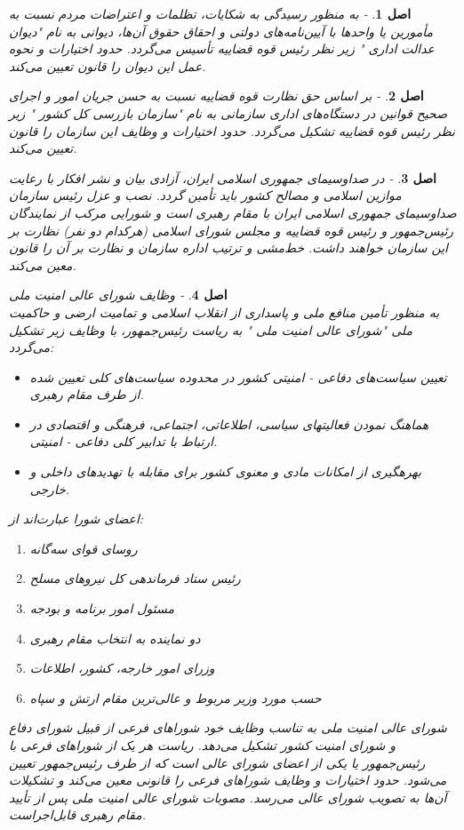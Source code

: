 \documentclass[12pt]{article}
\newtheorem{asl}{اصل}
\begin{document}
\begin{asl}- 
به منظور رسیدگی به شکایات، تظلمات و اعتراضات مردم نسبت به مأمورین یا واحدها با آیین‌نامه‌های دولتی و احقاق حقوق آن‌ها، دیوانی به نام "دیوان عدالت اداری " زیر نظر رئیس قوه قضاییه تأسیس می‌گردد. حدود اختیارات و نحوه عمل این دیوان را قانون تعیین می‌کند.  
\end{asl}

\begin{asl}- 
بر اساس حق نظارت قوه قضاییه نسبت به حسن جریان امور و اجرای صحیح قوانین در دستگاه‌های اداری سازمانی به نام "سازمان بازرسی کل کشور " زیر نظر رئیس قوه قضاییه تشکیل می‌گردد. حدود اختیارات و وظایف این سازمان را قانون تعیین می‌کند. 
\end{asl}

\begin{asl}- 
در صداوسیمای جمهوری اسلامی ایران، آزادی بیان و نشر افکار با رعایت موازین اسلامی و مصالح کشور باید تأمین گردد. نصب و عزل رئیس سازمان صداوسیمای جمهوری اسلامی ایران با مقام رهبری است و شورایی مرکب از نمایندگان رئیس‌جمهور و رئیس قوه قضاییه و مجلس شورای اسلامی (هرکدام دو نفر) نظارت بر این سازمان خواهند داشت. خط‌مشی و ترتیب اداره سازمان و نظارت بر آن را قانون معین می‌کند.  
\end{asl}

\begin{asl}- 
وظایف شورای عالی امنیت ملی 
\\
به منظور تأمین منافع ملی و پاسداری از انقلاب اسلامی و تمامیت ارضی و حاکمیت ملی "شورای عالی امنیت ملی " به ریاست رئیس‌جمهور، با وظایف زیر تشکیل می‌گردد:
\renewcommand{\labelitemi}{$-$}
\begin{itemize}
	\item 
	تعیین سیاست‌های دفاعی - امنیتی کشور در محدوده سیاست‌های کلی تعیین شده از طرف مقام رهبری. 
	\item
	هماهنگ نمودن فعالیت‏های سیاسی، اطلاعاتی، اجتماعی، فرهنگی و اقتصادی در ارتباط با تدابیر کلی دفاعی - امنیتی. 
	\item
		بهره‏گیری از امکانات مادی و معنوی کشور برای مقابله با تهدیدهای داخلی و خارجی.
\end{itemize}
اعضای شورا عبارت‌اند از:
\begin{enumerate}
	\item 
	روسای قوای سه‌گانه 
	\item
	رئیس ستاد فرماندهی کل نیروهای مسلح 	
	\item
	مسئول امور برنامه و بودجه 
	\item
	دو نماینده به انتخاب مقام رهبری 
	\item
	وزرای امور خارجه، کشور، اطلاعات 
	\item
	حسب مورد وزیر مربوط و عالی‌ترین مقام ارتش و سپاه 
	
\end{enumerate} 

شورای عالی امنیت ملی به تناسب وظایف خود شوراهای فرعی از قبیل شورای دفاع و شورای امنیت کشور تشکیل می‌دهد. ریاست هر یک از شوراهای فرعی با رئیس‌جمهور یا یکی از اعضای شورای عالی است که از طرف رئیس‌جمهور تعیین می‌شود. حدود اختیارات و وظایف شوراهای فرعی را قانونی معین می‌کند و تشکیلات آن‌ها به تصویب شورای عالی می‌رسد. مصوبات شورای عالی امنیت ملی پس از تأیید مقام رهبری قابل‌اجراست.

\end{asl}
\end{document}
